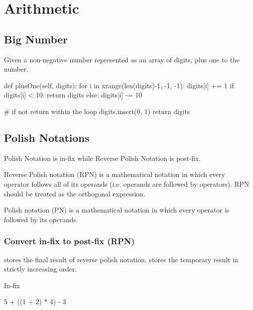 \chapter{Arithmetic}


\section{Big Number}
 Given a non-negative number represented as an array of digits, plus one to the number.
\begin{python}
def plusOne(self, digits):
    for i in xrange(len(digits)-1, -1, -1):
        digits[i] += 1
        if digits[i] < 10:
            return digits
        else:
            digits[i] -= 10

    # if not return within the loop 
    digits.insert(0, 1)
    return digits
\end{python}

\section{Polish Notations}
Polish Notation is in-fix while Reverse Polish Notation is post-fix. 

Reverse Polish notation (RPN) is a mathematical notation in which every operator follows all of its operands (i.e. operands are followed by operators). RPN should be treated as the orthogonal expression.  

Polish notation (PN) is a mathematical notation in which every operator is followed by its operands. 

\subsection{Convert in-fix to post-fix (RPN)}
 stores the final result of reverse polish notation.  stores
the temporary result in strictly increasing order. 

In-fix
\begin{python}
5 + ((1 + 2) * 4) - 3
\end{python}

